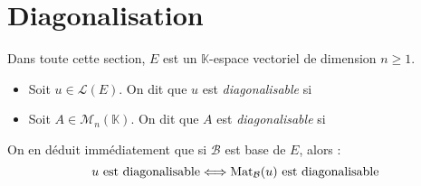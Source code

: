 \documentclass[french,11pt,twoside]{VcCours}
\begin{document}
\newpage

\section{Diagonalisation}
Dans toute cette section, $E$ est un $\mathbb{K}$-espace vectoriel de dimension $n \geq 1$.


\begin{Definition}{} 
\begin{itemize}
\item Soit $u \in \mathcal{L}(E)$. On dit que $u$ est \emph{diagonalisable} si 

\vspace{0.5cm}
%
\item Soit $A \in \mathcal{M}_n(\mathbb{K})$. On dit que $A$ est \emph{diagonalisable} si 

\vspace{0.5cm}
\end{itemize}
\end{Definition}

On en déduit immédiatement que si $\mathcal{B}$ est base de $E$, alors :
$$ u \hbox{ est diagonalisable} \Longleftrightarrow \textrm{Mat}_{\mathcal{B}}(u) \hbox{ est diagonalisable}$$
\end{document}
